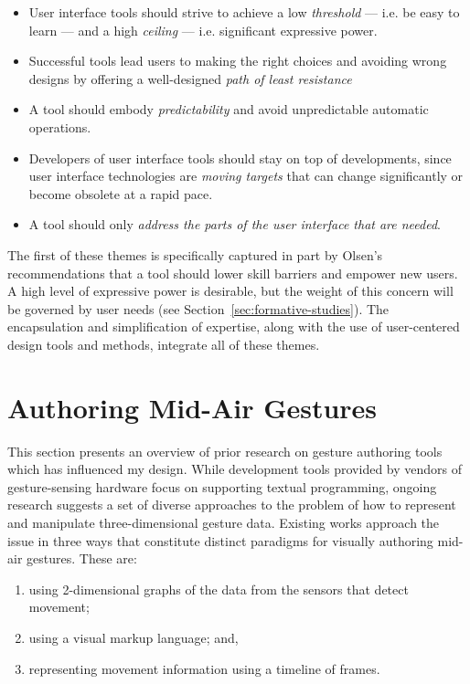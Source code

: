 \begin{itemize}
\item User interface tools should strive to achieve a low \emph{threshold} --- i.e. be easy to learn --- and a high \emph{ceiling} --- i.e. significant expressive power.
\item Successful tools lead users to making the right choices and avoiding wrong designs by offering a well-designed \emph{path of least resistance}
\item A tool should embody \emph{predictability} and avoid unpredictable automatic operations.
\item Developers of user interface tools should stay on top of developments, since user interface technologies are \emph{moving targets} that can change significantly or become obsolete at a rapid pace.
\item A tool should only \emph{address the parts of the user interface that are needed}.
\end{itemize}

The first of these themes is specifically captured in part by Olsen's recommendations that a tool should lower skill barriers and empower new users. A high level of expressive power is desirable, but the weight of this concern will be governed by user needs (see Section~\ref{sec:formative-studies}). The encapsulation and simplification of expertise, along with the use of user-centered design tools and methods, integrate all of these themes.

\section{Authoring Mid-Air Gestures}
\label{sec:authoring-mid-air-gestures}

This section presents an overview of prior research on gesture authoring tools which has influenced my design. While development tools provided by vendors of gesture-sensing hardware focus on supporting textual programming, ongoing research suggests a set of diverse approaches to the problem of how to represent and manipulate three-dimensional gesture data. Existing works approach the issue in three ways that constitute distinct paradigms for visually authoring mid-air gestures. These are:

\begin{enumerate}
\item using 2-dimensional graphs of the data from the sensors that detect movement;
\item using a visual markup language; and,
\item representing movement information using a timeline of
frames.
\end{enumerate}

